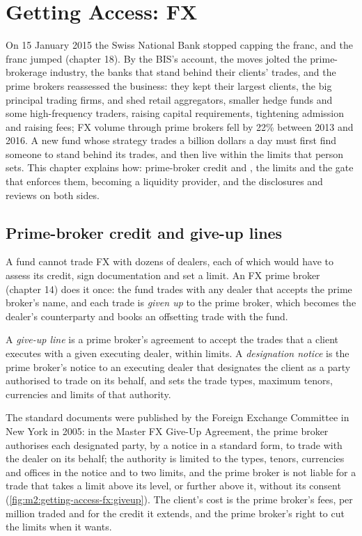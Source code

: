\chapter{Getting Access: FX}\label{ch:m2:getting-access-fx}

On 15 January 2015 the Swiss National Bank stopped capping the franc, and the franc
jumped (chapter 18). By the BIS's account, the moves jolted the prime-brokerage
industry, the banks that stand behind their clients' trades, and the prime brokers
reassessed the business: they kept their largest clients, the big
principal trading firms, and shed retail aggregators, smaller hedge funds and some
high-frequency traders, raising capital requirements, tightening admission and raising
fees; FX volume through prime brokers fell by 22\% between 2013 and 2016. A new fund
whose strategy trades a billion dollars a day must first find someone to stand behind
its trades, and then live within the limits that person sets. This chapter explains
how: prime-broker credit and , the limits and the gate that enforces them,
becoming a liquidity provider, and the disclosures and reviews on both sides.

\section{Prime-broker credit and give-up lines}

A fund cannot trade FX with dozens of dealers, each of which would have to assess its
credit, sign documentation and set a limit. An FX prime broker (chapter 14) does it
once: the fund trades with any dealer that accepts the prime broker's name, and each
trade is \emph{given up} to the prime broker, which becomes the dealer's counterparty
and books an offsetting trade with the fund.

\begin{definition}\label{def:m2:getting-access-fx:giveup}
A \emph{give-up line} is a prime broker's agreement to accept the
trades that a client executes with a given executing dealer, within limits. A
\emph{designation notice} is the prime broker's notice to an
executing dealer that designates the client as a party authorised to trade on its
behalf, and sets the trade types, maximum tenors, currencies and limits of that
authority.
\end{definition}

The standard documents were published by the Foreign Exchange Committee in New York in
2005: in the Master FX Give-Up Agreement, the prime broker authorises each designated
party, by a notice in a standard form, to trade with the dealer on its behalf; the
authority is limited to the types, tenors, currencies and offices in the notice and to
two limits, and the prime broker is not liable for a trade that takes a limit above
its level, or further above it, without its consent
(\cref{fig:m2:getting-access-fx:giveup}). The client's cost is the prime broker's fees,
per million traded and for the credit it extends, and the prime broker's right to cut
the limits when it wants.


